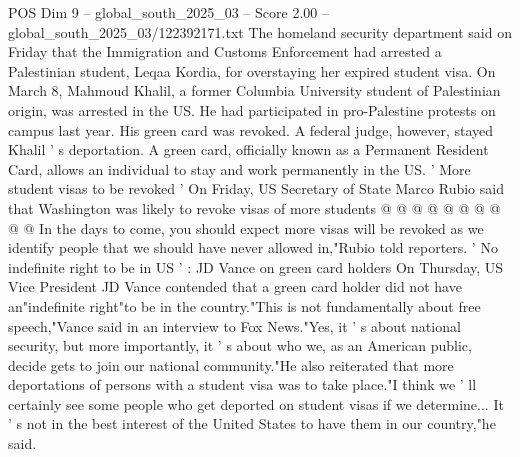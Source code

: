 \begin{textsample}{POS Dim 9 – global\_south\_2025\_03 – Score 2.00 – global\_south\_2025\_03/122392171.txt}
The homeland security department said on Friday that the Immigration and Customs Enforcement had arrested a Palestinian student, Leqaa Kordia, for overstaying her expired student visa.
On March 8, Mahmoud Khalil, a former Columbia University student of Palestinian origin, was arrested in the US.
He had participated in pro-Palestine protests on campus last year.
His green card was revoked.
A federal judge, however, stayed Khalil ' s deportation.
A green card, officially known as a Permanent Resident Card, allows an individual to stay and work permanently in the US. ' More student visas to be revoked ' On Friday, US Secretary of State Marco Rubio said that Washington was likely to revoke visas of more students @ @ @ @ @ @ @ @ @ @ In the days to come, you should expect more visas will be revoked as we identify people that we should have never allowed in,"Rubio told reporters. ' No indefinite right to be in US ' : JD Vance on green card holders On Thursday, US Vice President JD Vance contended that a green card holder did not have an"indefinite right"to be in the country."This is not fundamentally about free speech,"Vance said in an interview to Fox News."Yes, it ' s about national security, but more importantly, it ' s about who we, as an American public, decide gets to join our national community."He also reiterated that more deportations of persons with a student visa was to take place."I think we ' ll certainly see some people who get deported on student visas if we determine...
It ' s not in the best interest of the United States to have them in our country,"he said.

\end{textsample}
